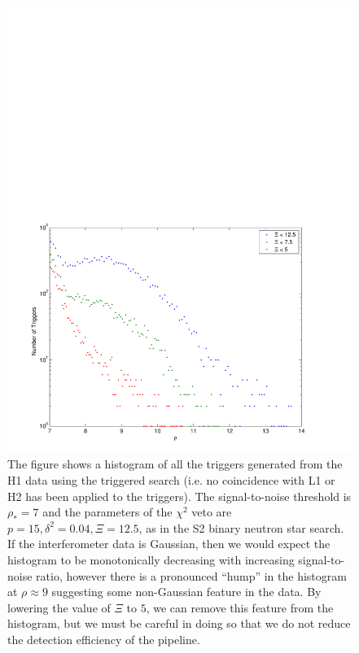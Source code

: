 \begin{figure}[p]
\begin{center}
\includegraphics[width=\textwidth]{figures/result/h1l1_snr_hist_delta_0_04_chisq_12_5}
\end{center}
\caption[Tuning the $\chi^2$ Veto for H1]{%
\label{f:h1_chiqsq_tuning}%
The figure shows a histogram of all the triggers generated from the H1 data
using the triggered search (i.e. no coincidence with L1 or H2 has been applied
to the triggers). The signal-to-noise threshold is $\rho_\ast = 7$ and the
parameters of the $\chi^2$ veto are $p = 15, \delta^2 = 0.04, \Xi = 12.5$, as
in the S2 binary neutron star search. If the interferometer data is Gaussian,
then we would expect the histogram to be monotonically decreasing with
increasing signal-to-noise ratio, however there is a pronounced ``hump'' in the
histogram at $\rho\approx 9$ suggesting some non-Gaussian feature in the data.
By lowering the value of $\Xi$ to $5$, we can remove this feature from the
histogram, but we must be careful in doing so that we do not reduce the
detection efficiency of the pipeline.
}
\end{figure}

